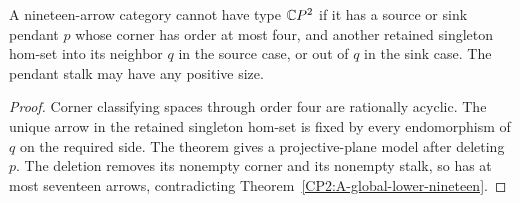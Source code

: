 \begin{corollary}
\label{CP2:A-nineteen-pendant-arbitrary-stalk-fold}
A nineteen-arrow category cannot have type $\mathbb{C}P^2$ if it has
a source or sink pendant $p$ whose corner has order at most four,
and another retained singleton hom-set into its neighbor $q$
in the source case, or out of $q$ in the sink case.
The pendant stalk may have any positive size.
\end{corollary}
\begin{proof}
Corner classifying spaces through order four are rationally
acyclic. The unique arrow in the retained singleton hom-set
is fixed by every endomorphism of $q$ on the required side.
The theorem gives a projective-plane model after deleting $p$.
The deletion removes its nonempty corner and its nonempty stalk,
so has at most seventeen arrows, contradicting
Theorem~\ref{CP2:A-global-lower-nineteen}.
\end{proof}
